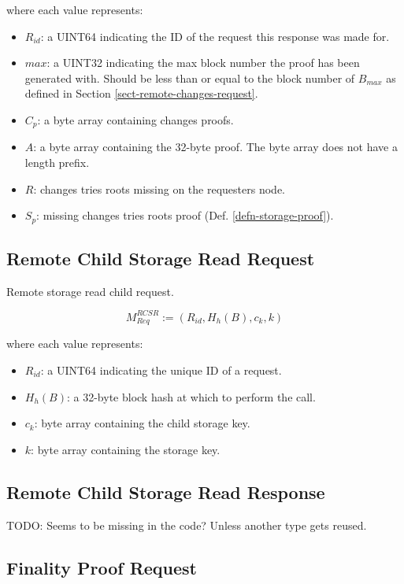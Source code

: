 \documentclass{book}
\newcommand{\todo}[1]{}
\renewcommand{\todo}[1]{{\color{red} TODO: {#1}}}
\begin{document}
where each value represents:

\begin{itemize}
    \item $R_{id}$: a UINT64 indicating the ID of the request this response was
    made for.
    \item $max$: a UINT32 indicating the max block number the proof has been
    generated with. Should be less than or equal to the block number of
    $B_{max}$ as defined in Section \ref{sect-remote-changes-request}.
    \item $C_p$: a byte array containing changes proofs.
    \item $A$: a byte array containing the 32-byte proof. The byte array does
    not have a length prefix.
    \item $R$: changes tries roots missing on the requesters node.
    \item $S_p$: missing changes tries roots proof (Def.
    \ref{defn-storage-proof}).
\end{itemize}

\subsection{Remote Child Storage Read Request}

Remote storage read child request.

\[
    M^{RCSR}_{Req} := (R_{id}, H_h(B), c_k, k)
\]

where each value represents:

\begin{itemize}
    \item $R_{id}$: a UINT64 indicating the unique ID of a request.
    \item $H_h(B)$: a 32-byte block hash at which to perform the call.
    \item $c_k$: byte array containing the child storage key.
    \item $k$: byte array containing the storage key.
\end{itemize}

\subsection{Remote Child Storage Read Response}

\todo{Seems to be missing in the code? Unless another type gets reused.}

\subsection{Finality Proof Request}\label{sect-finality-proof-request}
\end{document}
